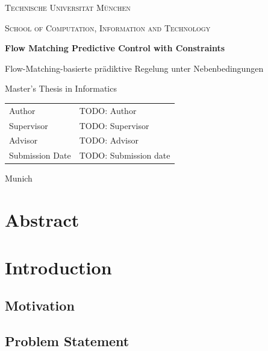\documentclass[headsepline,footsepline,footinclude=false,oneside,fontsize=11pt,paper=a4,listof=totoc,bibliography=totoc]{scrbook}
\newcommand*{\getUniversity}{Technische Universität München}
\newcommand*{\getDegree}{Informatics}
\newcommand*{\getSchool}{Computation, Information and Technology}
\newcommand*{\getTitle}{Flow Matching Predictive Control with Constraints}
\newcommand*{\getTitleGer}{Flow-Matching-basierte prädiktive Regelung unter Nebenbedingungen} %
\newcommand*{\getAuthor}{TODO: Author}
\newcommand*{\getDoctype}{Master's Thesis in \getDegree}
\newcommand*{\getSupervisor}{TODO: Supervisor}
\newcommand*{\getAdvisor}{TODO: Advisor}
\newcommand*{\getSubmissionDate}{TODO: Submission date}
\newcommand*{\getSubmissionLocation}{Munich}
\begin{document}
\ifstandalone
  \begin{titlepage}
    \centering
    \vspace*{2cm}
    {\scshape\LARGE \getUniversity\par}
    \vspace{0.5cm}
    {\scshape\large School of \getSchool\par}
    \vspace{2.5cm}
    {\huge\bfseries \getTitle\par}
    \vspace{1cm}
    {\Large \getTitleGer\par}
    \vspace{2.5cm}
    {\Large \getDoctype\par}
    \vspace{1.5cm}
    \begin{tabular}{ll}
      Author          & \getAuthor          \\
      Supervisor      & \getSupervisor      \\
      Advisor         & \getAdvisor         \\
      Submission Date & \getSubmissionDate  \\
    \end{tabular}
    \vfill
    {\large \getSubmissionLocation\par}
  \end{titlepage}
\else
  
\fi

\frontmatter{}

\ifstandalone
  \chapter*{Abstract}
\else
  
  
  
  
\fi

\tableofcontents{}

\mainmatter{}

\chapter{Introduction}\label{ch:introduction}
\section{Motivation}
\section{Problem Statement}
\end{document}
